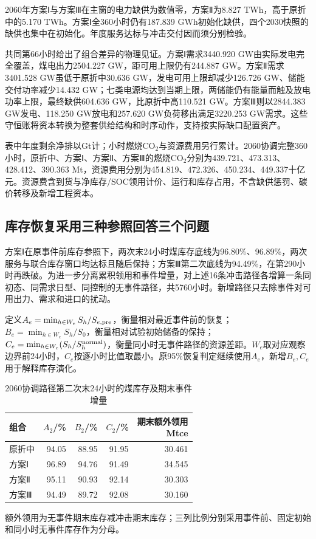 2060年方案Ⅰ与方案Ⅲ在主窗的电力缺供为数值零，方案Ⅱ为8.827 TWh，高于原折中的5.170 TWh。方案Ⅰ全360小时仍有187.839 GWh初始化缺供，四个2030快照的缺供也集中在初始化。年度服务达标与冲击交付因而须分别检验。

共同第66小时给出了组合差异的物理见证。方案Ⅰ需求3440.920 GW由实际发电完全覆盖，煤电出力2504.227 GW，距可用上限仍有244.887 GW。方案Ⅱ需求3401.528 GW虽低于原折中30.636 GW，发电可用上限却减少126.726 GW、储能交付功率减少14.432 GW；七类电源均达到当期上限，两储能仍有能量而触及放电功率上限，最终缺供604.636 GW，比原折中高110.521 GW。方案Ⅲ则以2844.383 GW发电、118.250 GW放电和257.620 GW负荷移出满足3220.253 GW需求。这些守恒账将资本转换为整套供给结构和时序动作，支持按实际缺口配置资产。

表中年度剩余净排以Gt计；小时燃烧CO$_2$与资源费用另行累计。2060协调完整360小时，原折中、方案Ⅰ、方案Ⅱ、方案Ⅲ的燃烧CO$_2$分别为439.721、473.313、428.412、390.363 Mt，资源费用分别为454.819、472.326、450.234、449.337十亿元。资源费含到货与净库存/SOC领用计价、运行和库存占用，不含缺供惩罚、碳价转移及新增工程资本。

\subsection{库存恢复采用三种参照回答三个问题}
方案Ⅰ在原事件前库存参照下，两次末24小时煤库存底线为96.80\%、96.89\%，两次服务与联合库存窗口均达标且随后保持；方案Ⅲ第二次底线为94.49\%，在第290小时再跌破。为进一步分离累积领用和事件增量，对上述16条冲击路径各增算一条同初态、同需求日型、同控制的无事件路径，共5760小时。新增路径只去除事件对可用出力、需求和进口的扰动。

定义$A_e=\min_{h\in W_e}S_h/S_{e,\rm pre}$，衡量相对最近事件前的恢复；$B_e=\min_{h\in W_e}S_h/S_0$，衡量相对试验初始储备的保持；$C_e=\min_{h\in W_e}(S_h/S_h^{\rm normal})$，衡量同小时无事件路径的资源差距。$W_e$取对应观察边界前24小时，$C_e$按逐小时比值取最小。原95\%恢复判定继续使用$A_e$，新增$B_e,C_e$用于解释库存演化。
\begin{table}[H]\centering\caption{2060协调路径第二次末24小时的煤库存及期末事件增量}
\begin{tabular}{lrrrr}\toprule
组合 & $A_2$/\% & $B_2$/\% & $C_2$/\% & \shortstack{期末额外领用\\Mtce}\\\midrule
原折中 & 94.05 & 88.95 & 91.95 & 30.461 \\
方案Ⅰ & 96.89 & 94.76 & 91.49 & 34.545 \\
方案Ⅱ & 95.11 & 90.93 & 92.14 & 30.303 \\
方案Ⅲ & 94.49 & 89.72 & 92.08 & 30.160 \\
\bottomrule\end{tabular}
\smallskip\par\noindent 额外领用为无事件期末库存减冲击期末库存；三列比例分别采用事件前、固定初始和同小时无事件库存作为分母。
\end{table}

